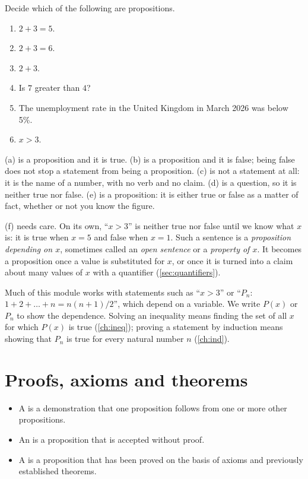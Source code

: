 \begin{example}
Decide which of the following are propositions.
\begin{enumerate}
  \item $2+3=5$.
  \item $2+3=6$.
  \item $2+3$.
  \item Is $7$ greater than $4$?
  \item The unemployment rate in the United Kingdom in March 2026 was below 5\%.
  \item $x>3$.
\end{enumerate}
\solution
(a) is a proposition and it is true. (b) is a proposition and it is false; being false does not stop a
statement from being a proposition. (c) is not a statement at all: it is the name of a number, with no
verb and no claim. (d) is a question, so it is neither true nor false. (e) is a proposition: it is
either true or false as a matter of fact, whether or not you know the figure.

(f) needs care. On its own, ``$x>3$'' is neither true nor false until we know what $x$ is: it is true
when $x=5$ and false when $x=1$. Such a sentence is a \emph{proposition depending on $x$}, sometimes
called an \emph{open sentence} or a \emph{property of $x$}. It becomes a proposition once a value is
substituted for $x$, or once it is turned into a claim about many values of $x$ with a quantifier
(\cref{sec:quantifiers}).
\end{example}

\begin{note}
Much of this module works with statements such as ``$x>3$'' or ``$P_n$: $1+2+\dots+n=n(n+1)/2$'',
which depend on a variable. We write $P(x)$ or $P_n$ to show the dependence. Solving an inequality
means finding the set of all $x$ for which $P(x)$ is true (\cref{ch:ineq}); proving a statement by
induction means showing that $P_n$ is true for every natural number $n$ (\cref{ch:ind}).
\end{note}

\section{Proofs, axioms and theorems}\label{sec:proof}

\begin{definition}
\begin{itemize}
  \item A  is a demonstration that one proposition follows from one or more other
  propositions.
  \item An  is a proposition that is accepted without proof.
  \item A  is a proposition that has been proved on the basis of axioms and previously
  established theorems.
\end{itemize}
\end{definition}

